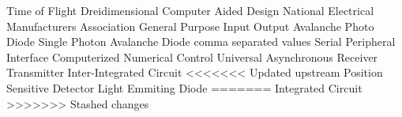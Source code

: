 
	{Time of Flight}
	{Dreidimensional}
	{Computer Aided Design}
	{National Electrical Manufacturers Association}
	{General Purpose Input Output}
	{Avalanche Photo Diode}
	{Single Photon Avalanche Diode}
	{comma separated values}
	{Serial Peripheral Interface}
	{Computerized Numerical Control}	
	{Universal Asynchronous Receiver Transmitter}
	{Inter-Integrated Circuit}
<<<<<<< Updated upstream
	{Position Sensitive Detector}
	{Light Emmiting Diode}
=======
	{Integrated Circuit}
>>>>>>> Stashed changes
